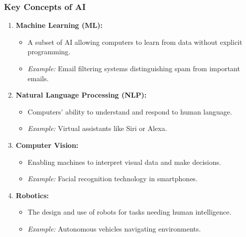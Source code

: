 \documentclass{beamer}
\begin{document}
\begin{frame}[fragile]
    \frametitle{Key Concepts of AI}
    \begin{enumerate}
        \item \textbf{Machine Learning (ML):}
        \begin{itemize}
            \item A subset of AI allowing computers to learn from data without explicit programming.
            \item \textit{Example:} Email filtering systems distinguishing spam from important emails.
        \end{itemize}
        
        \item \textbf{Natural Language Processing (NLP):}
        \begin{itemize}
            \item Computers' ability to understand and respond to human language.
            \item \textit{Example:} Virtual assistants like Siri or Alexa.
        \end{itemize}
        
        \item \textbf{Computer Vision:}
        \begin{itemize}
            \item Enabling machines to interpret visual data and make decisions.
            \item \textit{Example:} Facial recognition technology in smartphones.
        \end{itemize}
        
        \item \textbf{Robotics:}
        \begin{itemize}
            \item The design and use of robots for tasks needing human intelligence.
            \item \textit{Example:} Autonomous vehicles navigating environments.
        \end{itemize}
    \end{enumerate}
\end{frame}
\end{document}
